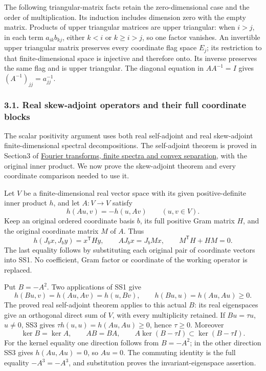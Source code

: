\documentclass[
  11pt,
]{article}
\begin{document}
The following triangular-matrix facts retain the zero-dimensional case
and the order of multiplication. Its induction includes dimension zero
with the empty matrix. Products of upper triangular matrices are upper
triangular: when \(i>j\), in each term \(a_{ik}b_{kj}\), either \(k<i\)
or \(k\geq i>j\), so one factor vanishes. An invertible upper triangular
matrix preserves every coordinate flag space \(E_j\); its restriction to
that finite-dimensional space is injective and therefore onto. Its
inverse preserves the same flag and is upper triangular. The diagonal
equation in \(AA^{-1}=I\) gives \((A^{-1})_{jj}=a_{jj}^{-1}\).

\subsubsection{3.1. Real skew-adjoint operators and their full
coordinate
blocks}\label{real-skew-adjoint-operators-and-their-full-coordinate-blocks}

The scalar positivity argument uses both real self-adjoint and real
skew-adjoint finite-dimensional spectral decompositions. The
self-adjoint theorem is proved in Section3 of
\href{prerequisite-bridges.pdf}{Fourier transforms, finite spectra and
convex separation}, with the original inner product. We now prove the
skew-adjoint theorem and every coordinate comparison needed to use it.

Let \(V\) be a finite-dimensional real vector space with its given
positive-definite inner product \(h\), and let \(A:V\to V\) satisfy \[
h(Au,v)=-h(u,Av)\qquad(u,v\in V).
\tag{SS1}
\] Keep an original ordered coordinate basis \(b\), its full positive
Gram matrix \(H\), and the original coordinate matrix \(M\) of \(A\).
Thus \[
h(J_bx,J_by)=x^{\mathsf T}Hy,\qquad
AJ_bx=J_bMx,\qquad M^{\mathsf T}H+HM=0.
\tag{SS2}
\] The last equality follows by substituting each original pair of
coordinate vectors into SS1. No coefficient, Gram factor or coordinate
of the working operator is replaced.

Put \(B=-A^2\). Two applications of SS1 give \[
h(Bu,v)=h(Au,Av)=h(u,Bv),\qquad
h(Bu,u)=h(Au,Au)\geq0.
\tag{SS3}
\] The proved real self-adjoint theorem applies to this actual \(B\):
its real eigenspaces give an orthogonal direct sum of \(V\), with every
multiplicity retained. If \(Bu=\tau u\), \(u\ne0\), SS3 gives
\(\tau h(u,u)=h(Au,Au)\geq0\), hence \(\tau\geq0\). Moreover \[
\ker B=\ker A,\qquad AB=BA,\qquad
A\ker(B-\tau I)\subset\ker(B-\tau I).
\tag{SS4}
\] For the kernel equality one direction follows from \(B=-A^2\); in the
other direction SS3 gives \(h(Au,Au)=0\), so \(Au=0\). The commuting
identity is the full equality \(-A^3=-A^3\), and substitution proves the
invariant-eigenspace assertion.
\end{document}
